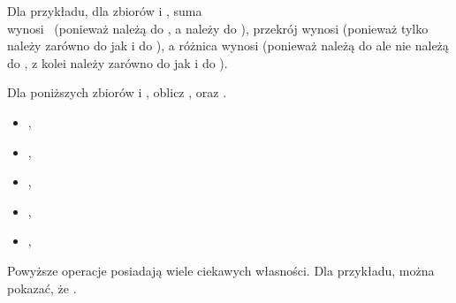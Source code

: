 Dla przykładu, dla zbiorów  i , suma  \\wynosi~ (ponieważ  należą do , a  należy do ), przekrój  wynosi  (ponieważ tylko  należy zarówno do  jak i do ), a różnica  wynosi  (ponieważ  należą do  ale nie należą do , z kolei  należy zarówno do  jak i do ).

\begin{ex}
Dla poniższych zbiorów  i , oblicz ,  oraz .

\begin{itemize}
    \item {}, 
    \item {}, 
    \item {}, 
    \item {}, 
    \item {}, 
\end{itemize}
\end{ex}

Powyższe operacje posiadają wiele ciekawych własności. Dla przykładu, można pokazać, że . 

